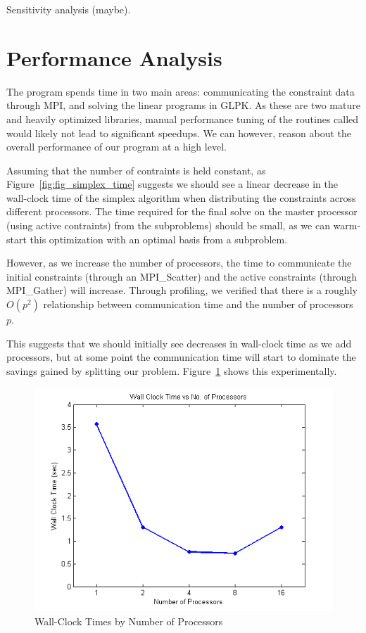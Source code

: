\documentclass[12pt]{article}
\begin{document}
Sensitivity analysis (maybe).
\section*{Performance Analysis}

The program spends time in two main areas: communicating the constraint data through MPI, and solving the linear programs in GLPK.  
As these are two mature and heavily optimized libraries, manual performance tuning of the routines called would likely not lead to significant speedups.
We can however, reason about the overall performance of our program at a high level.

Assuming that the number of contraints is held constant, as Figure~\ref{fig:fig_simplex_time} suggests we should see a linear decrease in the wall-clock time of the simplex algorithm when distributing the constraints across different processors.  
The time required for the final solve on the master processor (using active contraints) from the subproblems) should be small, as we can warm-start this optimization with an optimal basis from a subproblem.

However, as we increase the number of processors, the time to communicate the initial constraints (through an MPI\_Scatter) and the active constraints (through MPI\_Gather) will increase.
Through profiling, we verified that there is a roughly $O(p^2)$ relationship between communication time and the number of processors $p$.

This suggests that we should initially see decreases in wall-clock time as we add processors, but at some point the communication time will start to dominate the savings gained by splitting our problem.  Figure~\ref{fig:wct_numproc} shows this experimentally. 

\begin{figure}[ht]
    \centering
        \includegraphics{../plot/figs/wct_numproc.png}
    \caption{Wall-Clock Times by Number of Processors}
    \label{fig:wct_numproc}
\end{figure}
\end{document}
